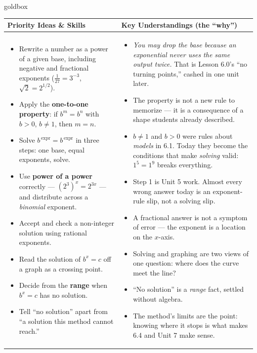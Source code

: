 \documentclass[10pt]{article}
\begin{document}
\renewcommand{\arraystretch}{1.4}
\begin{skillbox}{goldbox}
\begin{tabularx}{\linewidth}{@{}X|X@{}}
\textbf{Priority Ideas \& Skills} & \textbf{Key Understandings (the ``why'')} \\[2pt]
\hline
\vspace{-6pt}
\begin{itemize}[leftmargin=1.1em, nosep, after=\vspace{2pt}]
  \item Rewrite a number as a power of a given base, including negative and fractional exponents ($\frac{1}{27}=3^{-3}$, $\sqrt2=2^{1/2}$).
  \item Apply the \textbf{one-to-one property}: if $b^{m}=b^{n}$ with $b>0$, $b\neq1$, then $m=n$.
  \item Solve $b^{\,\text{expr}}=b^{\,\text{expr}}$ in three steps: one base, equal exponents, solve.
  \item Use \textbf{power of a power} correctly --- $\left(2^{3}\right)^{x}=2^{3x}$ --- and distribute across a \emph{binomial} exponent.
  \item Accept and check a non-integer solution using rational exponents.
  \item Read the solution of $b^{x}=c$ off a graph as a crossing point.
  \item Decide from the \textbf{range} when $b^{x}=c$ has no solution.
  \item Tell ``no solution'' apart from ``a solution this method cannot reach.''
\end{itemize}
&
\vspace{-6pt}
\begin{itemize}[leftmargin=1.1em, nosep, after=\vspace{2pt}]
  \item \emph{You may drop the base because an exponential never uses the same output twice.} That is Lesson 6.0's ``no turning points,'' cashed in one unit later.
  \item The property is not a new rule to memorize --- it is a consequence of a shape students already described.
  \item $b\neq1$ and $b>0$ were rules about \emph{models} in 6.1. Today they become the conditions that make \emph{solving} valid: $1^{5}=1^{9}$ breaks everything.
  \item Step 1 is Unit 5 work. Almost every wrong answer today is an exponent-rule slip, not a solving slip.
  \item A fractional answer is not a symptom of error --- the exponent is a location on the $x$-axis.
  \item Solving and graphing are two views of one question: where does the curve meet the line?
  \item ``No solution'' is a \emph{range} fact, settled without algebra.
  \item The method's limits are the point: knowing where it stops is what makes 6.4 and Unit 7 make sense.
\end{itemize}
\end{tabularx}
\end{skillbox}
\end{document}
